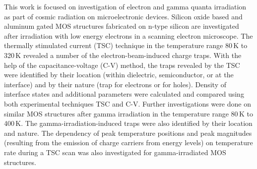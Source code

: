 \documentclass[a4paper,12pt]{article}
\begin{document}
This work is focused on investigation of electron and gamma quanta irradiation as part of cosmic radiation on microelectronic devices. Silicon oxide based and aluminum gated MOS structures fabricated on n-type silicon are investigated after irradiation with low energy electrons in a scanning electron microscope. The thermally stimulated current (TSC) technique in the temperature range 80\,K to 320\,K revealed a number of the electron-beam-induced charge traps. With the help of the capacitance-voltage (C-V) method, the traps revealed by the TSC were identified by their location (within dielectric, semiconductor, or at the interface) and by their nature (trap for electrons or for holes). Density of interface states and additional parameters were calculated and compared using both experimental techniques TSC and C-V. Further investigations were done on similar MOS structures after gamma irradiation in the temperature range 80\,K to 400\,K. The gamma-irradiation-induced traps were also identified by their location and nature. The dependency of peak temperature positions and peak magnitudes (resulting from the emission of charge carriers from energy levels) on temperature rate during a TSC scan was also investigated for gamma-irradiated MOS structures.
\end{document}
